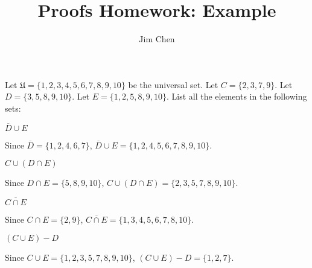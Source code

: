 \documentclass{mlatext}
\title{Proofs Homework: Example}
\author{Jim Chen}
\begin{document}
\maketitlepage
\begin{qst}
  Let $\mathfrak{U} = \{1, 2, 3, 4, 5, 6, 7, 8, 9, 10\}$ be the universal set. Let $C = \{2, 3, 7, 9\}$. Let $D = \{3, 5, 8, 9, 10\}$. Let $E = \{1, 2, 5, 8, 9, 10\}$. List all the elements in the following sets:
  \begin{subproblem}
  \item $\overline{D} \cup E$
    \begin{sol}
      Since $\overline{D} = \{1, 2, 4, 6, 7\}$, $\overline{D} \cup E = \{1, 2, 4, 5, 6, 7, 8, 9, 10\}$.
    \end{sol}
  \item $C \cup (D \cap E)$
    \begin{sol}
      Since $D \cap E = \{5, 8, 9, 10\}$, $C \cup (D \cap E) = \{2, 3, 5, 7, 8, 9, 10\}$.
    \end{sol}
  \item $\overline{C \cap E}$
    \begin{sol}
      Since $C \cap E = \{2, 9\}$, $\overline{C \cap E} = \{1, 3, 4, 5, 6, 7, 8, 10\}$.
    \end{sol}
  \item $(C \cup E) - D$
    \begin{sol}
      Since $C \cup E = \{1, 2, 3, 5, 7, 8, 9, 10\}$, $(C \cup E) - D = \{1, 2, 7\}$.
    \end{sol}
  \end{subproblem}
\end{qst}
\end{document}
